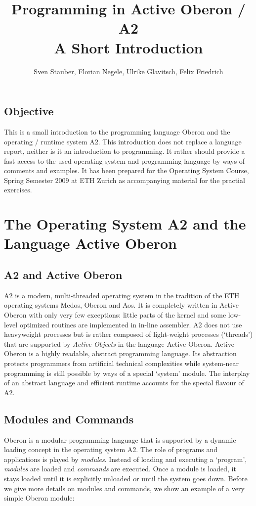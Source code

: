 \documentclass[a4wide,11pt]{article}
\begin{document}
\title{Programming in Active Oberon / A2 \\[1em] \normalsize A Short Introduction}
\author{Sven Stauber, Florian Negele, Ulrike Glavitsch, Felix Friedrich}
\maketitle

\tableofcontents
\subsection*{Objective}
This is a small introduction to the programming language Oberon and the operating / runtime system A2. This introduction does not replace a language report, neither is it an introduction to programming. It rather should provide a fast access to the used operating system and programming language by ways of comments and examples. It has been prepared for the Operating System Course, Spring Semester 2009 at ETH Zurich as accompanying material for the practial exercises.

\section{The Operating System A2 and the Language Active Oberon}
\subsection{A2 and Active Oberon}
A2 is a modern, multi-threaded operating system in the tradition of the ETH operating systems Medos, Oberon and Aos. It is completely written in Active Oberon with only very few exceptions: little parts of the kernel and some low-level optimized routines are implemented in in-line assembler. A2 does not use heavyweight processes but is rather composed of light-weight processes (`threads') that are supported by {\em Active Objects} in the language Active Oberon. Active Oberon is a highly readable, abstract programming language. Its abstraction protects programmers from artificial technical complexities while system-near programming is still possible by ways of a special `system' module. The interplay of an abstract language and efficient runtime accounts for the special flavour of A2.

\subsection{Modules and Commands}
Oberon is a modular programming language that is supported by a dynamic loading concept in the operating system A2. The role of programs and applications is played by {\em modules}. Instead of loading and executing a `program', {\em modules} are loaded and {\em commands} are executed. Once a module is loaded, it stays loaded until it is explicitly unloaded or until the system goes down. Before we give more details on modules and commands, we show an example of a very simple Oberon module:
\end{document}
